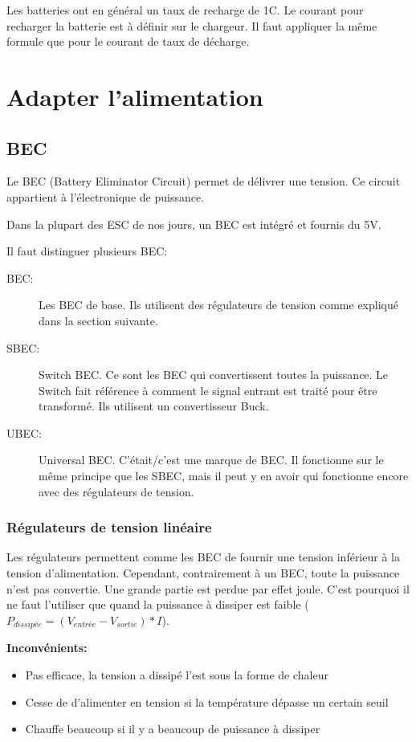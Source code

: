 \documentclass[a4paper, 11pt]{report}
\begin{document}
Les batteries ont en général un taux de recharge de 1C. Le courant pour recharger la batterie est à définir sur le chargeur. Il faut appliquer la même formule que pour le courant de taux de décharge.

\section{Adapter l'alimentation}

\subsection{BEC}
Le BEC (Battery Eliminator Circuit) permet de délivrer une tension. Ce circuit appartient à l'électronique de puissance.

Dans la plupart des ESC de nos jours, un BEC est intégré et fournis du 5V.

Il faut distinguer plusieurs BEC:
\begin{description}
\item[BEC:]Les BEC de base. Ils utilisent des régulateurs de tension comme expliqué dans la section suivante.
\item[SBEC:]Switch BEC. Ce sont les BEC qui convertissent toutes la puissance. Le Switch fait référence à comment le signal entrant est traité pour être transformé. Ils utilisent un convertisseur Buck.
\item[UBEC:]Universal BEC. C'était/c'est une marque de BEC. Il fonctionne sur le même principe que les SBEC, mais il peut y en avoir qui fonctionne encore avec des régulateurs de tension.
\end{description}

\subsubsection{Régulateurs de tension linéaire}
Les régulateurs permettent comme les BEC de fournir une tension inférieur à la tension d'alimentation. Cependant, contrairement à un BEC, toute la puissance n'est pas convertie. Une grande partie est perdue par effet joule. C'est pourquoi il ne faut l'utiliser que quand la puissance à dissiper est faible ($P_{dissipée} = (V_{entrée} - V_{sortie})*I$).

\textbf{Inconvénients:}
\begin{itemize}
\item Pas efficace, la tension a dissipé l'est sous la forme de chaleur
\item Cesse de d'alimenter en tension si la température dépasse un certain seuil
\item Chauffe beaucoup si il y a beaucoup de puissance à dissiper
\end{itemize}
\end{document}
